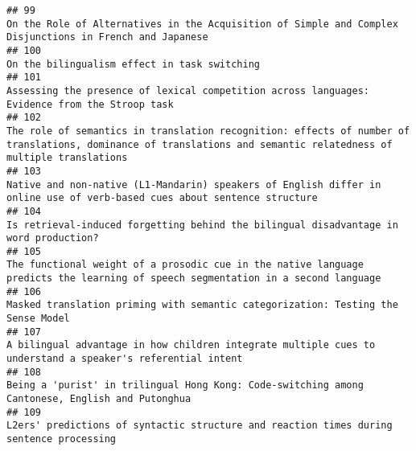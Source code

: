 \documentclass[
  english,
  man]{apa6}
\begin{document}
\begin{verbatim}
## 99                                                                                                                                  On the Role of Alternatives in the Acquisition of Simple and Complex Disjunctions in French and Japanese
## 100                                                                                                                                                                                             On the bilingualism effect in task switching
## 101                                                                                                                                            Assessing the presence of lexical competition across languages: Evidence from the Stroop task
## 102                                                                         The role of semantics in translation recognition: effects of number of translations, dominance of translations and semantic relatedness of multiple translations
## 103                                                                                                                 Native and non-native (L1-Mandarin) speakers of English differ in online use of verb-based cues about sentence structure
## 104                                                                                                                                                    Is retrieval-induced forgetting behind the bilingual disadvantage in word production?
## 105                                                                                                         The functional weight of a prosodic cue in the native language predicts the learning of speech segmentation in a second language
## 106                                                                                                                                                         Masked translation priming with semantic categorization: Testing the Sense Model
## 107                                                                                                                               A bilingual advantage in how children integrate multiple cues to understand a speaker's referential intent
## 108                                                                                                                                          Being a 'purist' in trilingual Hong Kong: Code-switching among Cantonese, English and Putonghua
## 109                                                                                                                                                  L2ers' predictions of syntactic structure and reaction times during sentence processing

\end{verbatim}
\end{document}

